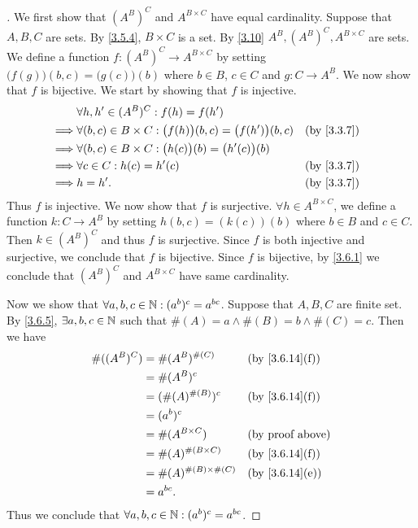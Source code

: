 \begin{proof}[]
	We first show that \((A^B)^C\) and \(A^{B \times C}\) have equal cardinality.
	Suppose that \(A, B, C\) are sets.
	By \cref{3.5.4}, \(B \times C\) is a set.
	By \cref{3.10} \(A^B, (A^B)^C, A^{B \times C}\) are sets.
	We define a function \(f : (A^B)^C \to A^{B \times C}\) by setting \(\big(f(g)\big)(b, c) = \big(g(c)\big)(b)\) where \(b \in B\), \(c \in C\) and \(g : C \to A^B\).
	We now show that \(f\) is bijective.
	We start by showing that \(f\) is injective.
	\begin{align*}
		         & \forall h, h' \in (A^B)^C : f(h) = f(h')                                                     \\
		\implies & \forall (b, c) \in B \times C : \big(f(h)\big)(b, c) = \big(f(h')\big)(b, c) &  & \by{3.3.7} \\
		\implies & \forall (b, c) \in B \times C : \big(h(c)\big)(b) = \big(h'(c)\big)(b)                       \\
		\implies & \forall c \in C : h(c) = h'(c)                                               &  & \by{3.3.7} \\
		\implies & h = h'.                                                                      &  & \by{3.3.7}
	\end{align*}
	Thus \(f\) is injective.
	We now show that \(f\) is surjective.
	\(\forall h \in A^{B \times C}\), we define a function \(k : C \to A^B\) by setting \(h(b, c) = (k(c))(b)\) where \(b \in B\) and \(c \in C\).
	Then \(k \in (A^B)^C\) and thus \(f\) is surjective.
	Since \(f\) is both injective and surjective, we conclude that \(f\) is bijective.
	Since \(f\) is bijective, by \cref{3.6.1} we conclude that \((A^B)^C\) and \(A^{B \times C}\) have same cardinality.

	Now we show that \(\forall a, b, c \in \mathbb{N} : (a^b)^c = a^{bc}\).
	Suppose that \(A, B, C\) are finite set.
	By \cref{3.6.5}, \(\exists a, b, c \in \mathbb{N}\) such that \(\#(A) = a \land \#(B) = b \land \#(C) = c\).
	Then we have
	\begin{align*}
		\#((A^B)^C) & = \#(A^B)^{\#(C)}            &  & \text{(by \cref{3.6.14}(f))} \\
		            & = \#(A^B)^c                                                    \\
		            & = (\#(A)^{\#(B)})^c          &  & \text{(by \cref{3.6.14}(f))} \\
		            & = (a^b)^c                                                      \\
		            & = \#(A^{B \times C})         &  & \text{(by proof above)}      \\
		            & = \#(A)^{\#(B \times C)}     &  & \text{(by \cref{3.6.14}(f))} \\
		            & = \#(A)^{\#(B) \times \#(C)} &  & \text{(by \cref{3.6.14}(e))} \\
		            & = a^{bc}.
	\end{align*}
	Thus we conclude that \(\forall a, b, c \in \mathbb{N} : (a^b)^c = a^{bc}\).


\end{proof}
